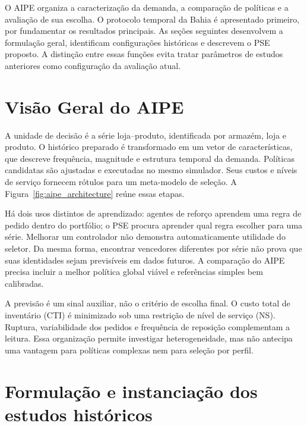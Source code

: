 
O AIPE organiza a caracterização da demanda, a comparação de políticas e a avaliação de sua escolha. O protocolo temporal da Bahia é apresentado primeiro, por fundamentar os resultados principais. As seções seguintes desenvolvem a formulação geral, identificam configurações históricas e descrevem o PSE proposto. A distinção entre essas funções evita tratar parâmetros de estudos anteriores como configuração da avaliação atual.



\section{Visão Geral do AIPE}
\label{sec:visao_geral_aipe}

A unidade de decisão é a série loja--produto, identificada por armazém, loja e produto. O histórico preparado é transformado em um vetor de características, que descreve frequência, magnitude e estrutura temporal da demanda. Políticas candidatas são ajustadas e executadas no mesmo simulador. Seus custos e níveis de serviço fornecem rótulos para um meta-modelo de seleção. A Figura~\ref{fig:aipe_architecture} reúne essas etapas.



Há dois usos distintos de aprendizado: agentes de reforço aprendem uma regra de pedido dentro do portfólio; o PSE procura aprender qual regra escolher para uma série. Melhorar um controlador não demonstra automaticamente utilidade do seletor. Da mesma forma, encontrar vencedores diferentes por série não prova que suas identidades sejam previsíveis em dados futuros. A comparação do AIPE precisa incluir a melhor política global viável e referências simples bem calibradas.

A previsão é um sinal auxiliar, não o critério de escolha final. O custo total de inventário (CTI) é minimizado sob uma restrição de nível de serviço (NS). Ruptura, variabilidade dos pedidos e frequência de reposição complementam a leitura. Essa organização permite investigar heterogeneidade, mas não antecipa uma vantagem para políticas complexas nem para seleção por perfil.

\section{Formulação e instanciação dos estudos históricos}
\label{sec:formulacao}

